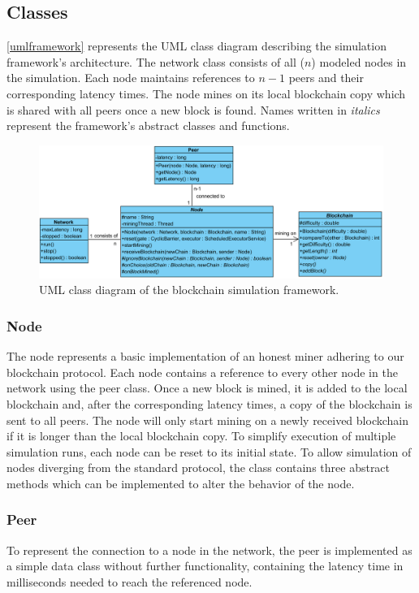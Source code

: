 \documentclass[a4paper,12pt,twoside]{report}
\begin{document}
\subsection{Classes}
\autoref{umlframework} represents the UML class diagram describing the simulation framework's architecture. The network class consists of all ($n$) modeled nodes in the simulation. Each node maintains references to $n-1$ peers and their corresponding latency times. The node mines on its local blockchain copy which is shared with all peers once a new block is found. Names written in \textit{italics} represent the framework's abstract classes and functions.
\begin{figure}[ht]
	\centering
  \includegraphics[width=\textwidth]{Framework.png}
	\caption{UML class diagram of the blockchain simulation framework.}
	\label{umlframework}
\end{figure}

\subsubsection{Node}
The node represents a basic implementation of an honest miner adhering to our blockchain protocol. Each node contains a reference to every other node in the network using the peer class. Once a new block is mined, it is added to the local blockchain and, after the corresponding latency times, a copy of the blockchain is sent to all peers. The node will only start mining on a newly received blockchain if it is longer than the local blockchain copy. To simplify execution of multiple simulation runs, each node can be reset to its initial state. To allow simulation of nodes diverging from the standard protocol, the class contains three abstract methods which can be implemented to alter the behavior of the node. 

\subsubsection{Peer}
To represent the connection to a node in the network, the peer is implemented as a simple data class without further functionality, containing the latency time in milliseconds needed to reach the referenced node.
\end{document}
